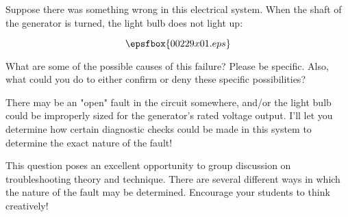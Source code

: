 

Suppose there was something wrong in this electrical system.  When the shaft of the generator is turned, the light bulb does not light up:

$$\epsfbox{00229x01.eps}$$

What are some of the possible causes of this failure?  Please be specific.  Also, what could you do to either confirm or deny these specific possibilities?







There may be an "open" fault in the circuit somewhere, and/or the light bulb could be improperly sized for the generator's rated voltage output.  I'll let you determine how certain diagnostic checks could be made in this system to determine the exact nature of the fault!







This question poses an excellent opportunity to group discussion on troubleshooting theory and technique.  There are several different ways in which the nature of the fault may be determined.  Encourage your students to think creatively!




